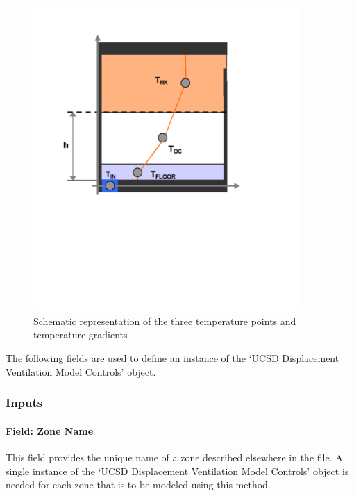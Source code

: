 \begin{figure}[hbtp] %
\centering
\includegraphics[width=0.9\textwidth, height=0.9\textheight, keepaspectratio=true]{media/image080.png}
\caption{Schematic representation of the three temperature points and temperature gradients \protect \label{fig:schematic-representation-of-the-three}}
\end{figure}

The following fields are used to define an instance of the `UCSD Displacement Ventilation Model Controls' object.

\subsubsection{Inputs}\label{inputs-8-020}

\paragraph{Field: Zone Name}\label{field-zone-name-4-005}

This field provides the unique name of a zone described elsewhere in the file. A single instance of the `UCSD Displacement Ventilation Model Controls' object is needed for each zone that is to be modeled using this method.

